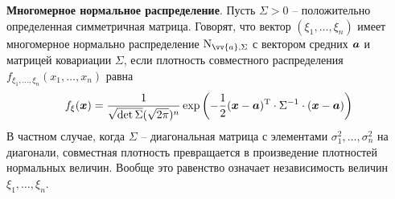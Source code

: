 \textbf{Многомерное нормальное распределение}. Пусть $\Sigma > 0$ -- положительно определенная симметричная матрица. Говорят, что вектор $(\xi_1, \ldots, \xi_n)$ имеет многомерное нормально распределение $\textnormal{N}_{\vv{a}, \Sigma}$ с вектором средних $\mbox{\boldmath $a$}$ и матрицей ковариации $\Sigma$, если плотность совместного распределения $f_{\xi_1, \ldots, \xi_n} (x_1, \ldots, x_n)$ равна
\begin{equation*}
    f_{\xi} (\mbox{\boldmath $x$}) = \frac{1}{\sqrt{\det \Sigma} (\sqrt{2 \pi})^n}
    \exp\left(
        - \frac{1}{2} (\mbox{\boldmath $x$}-\mbox{\boldmath $a$})^{\text{T}} \cdot \Sigma^{-1} \cdot (\mbox{\boldmath $x$} - \mbox{\boldmath $a$})
    \right)
\end{equation*}
В частном случае, когда $\Sigma$ -- диагональная матрица с элементами $\sigma_1^2, \ldots, \sigma_n^2$ на диагонали, совместная плотность превращается в произведение плотностей нормальных величин. Вообще это равенство означает независимость величин $\xi_1, \ldots, \xi_n$.